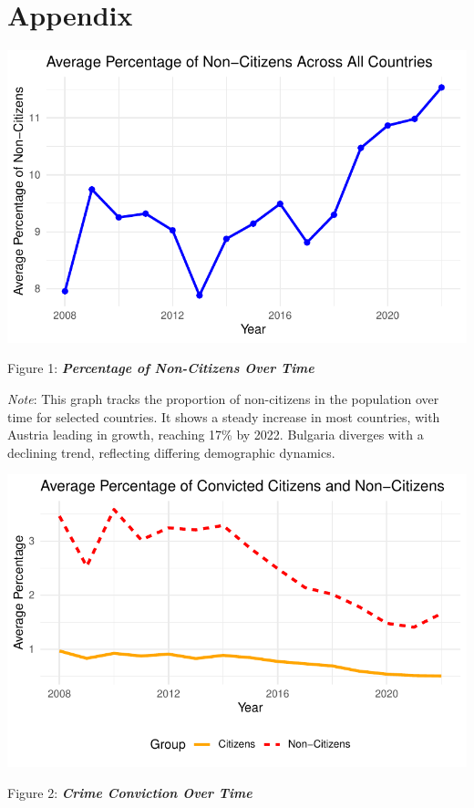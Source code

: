 \documentclass[
]{article}
\begin{document}
\section{Appendix}\label{appendix}

\includegraphics{DataMan_Project_files/figure-pdf/unnamed-chunk-24-1.pdf}

Figure 1: \textbf{\emph{Percentage of Non-Citizens Over Time}}

\emph{Note}: This graph tracks the proportion of non-citizens in the
population over time for selected countries. It shows a steady increase
in most countries, with Austria leading in growth, reaching 17\% by
2022. Bulgaria diverges with a declining trend, reflecting differing
demographic dynamics.

\includegraphics{DataMan_Project_files/figure-pdf/unnamed-chunk-25-1.pdf}

Figure 2: \textbf{\emph{Crime Conviction Over Time}}
\end{document}
